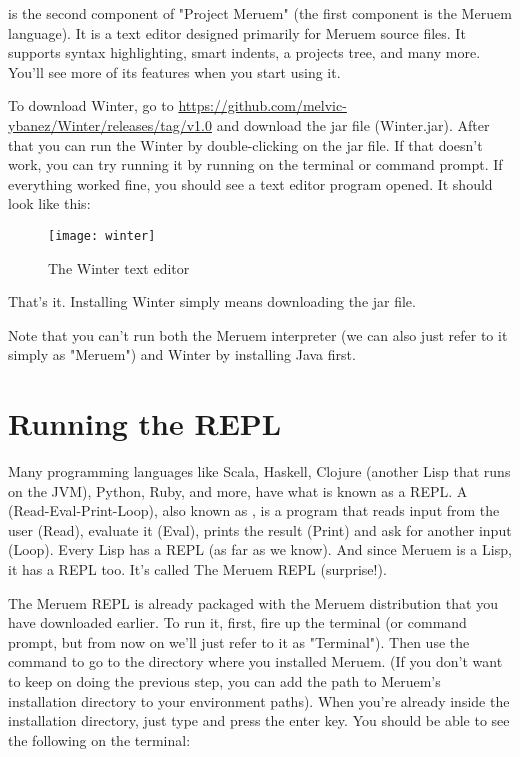  is the second component of "Project Meruem" (the first component is the Meruem language). It is a text editor designed primarily for Meruem source files. It supports syntax highlighting, smart indents, a projects tree, and many more. You'll see more of its features when you start using it.

To download Winter, go to \url{https://github.com/melvic-ybanez/Winter/releases/tag/v1.0} and download the jar file (Winter.jar). After that you can run the Winter by double-clicking on the jar file. If that doesn't work, you can try running it by running  on the terminal or command prompt. If everything worked fine, you should see a text editor program opened. It should look like this:

\begin{figure}[H]
\texttt{[image: winter]}
\caption{The Winter text editor}
\centering
\end{figure}

That's it. Installing Winter simply means downloading the jar file.

Note that you can't run both the Meruem interpreter (we can also just refer to it simply as "Meruem") and Winter by installing Java first.

\section{Running the REPL}
Many programming languages like Scala, Haskell, Clojure (another Lisp that runs on the JVM), Python, Ruby, and more, have what is known as a REPL. A  (Read-Eval-Print-Loop), also known as , is a program that reads input from the user (Read), evaluate it (Eval), prints the result (Print) and ask for another input (Loop). Every Lisp has a REPL (as far as we know). And since Meruem is a Lisp, it has a REPL too. It's called The Meruem REPL (surprise!). 

The Meruem REPL is already packaged with the Meruem distribution that you have downloaded earlier. To run it, first, fire up the terminal (or command prompt, but from now on we'll just refer to it as "Terminal"). Then use the  command to go to the directory where you installed Meruem. (If you don't want to keep on doing the previous step, you can add the path to Meruem's installation directory to your environment paths). When you're already inside the installation directory, just type  and press the enter key. You should be able to see the following on the terminal:

